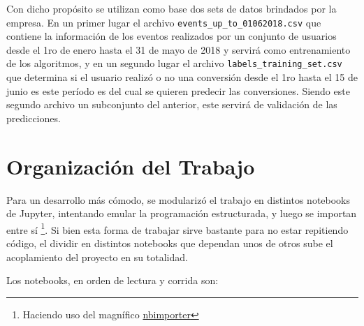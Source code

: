 \documentclass[a4paper]{article}
\begin{document}
Con dicho propósito se utilizan como base dos sets de datos brindados por la empresa. En un primer lugar el archivo \texttt{events\_up\_to\_01062018.csv} que contiene la información de los eventos realizados por un conjunto de usuarios desde el 1ro de enero hasta el 31 de mayo de 2018 y servirá como entrenamiento de los algoritmos, y en un segundo lugar el archivo \texttt{labels\_training\_set.csv} que determina si el usuario realizó o no una conversión desde el 1ro hasta el 15 de junio es este período es del cual se quieren predecir las conversiones. Siendo este segundo archivo un subconjunto del anterior, este servirá de validación de las predicciones.

\section{Organización del Trabajo}

Para un desarrollo más cómodo, se modularizó el trabajo en distintos notebooks de Jupyter, intentando emular la programación estructurada, y luego se importan entre sí \footnote{Haciendo uso del magnífico \href{https://github.com/grst/nbimporter}{nbimporter}}. Si bien esta forma de trabajar sirve bastante para no estar repitiendo código, el dividir en distintos notebooks que dependan unos de otros sube el acoplamiento del proyecto en su totalidad.

Los notebooks, en orden de lectura y corrida son:
\end{document}
